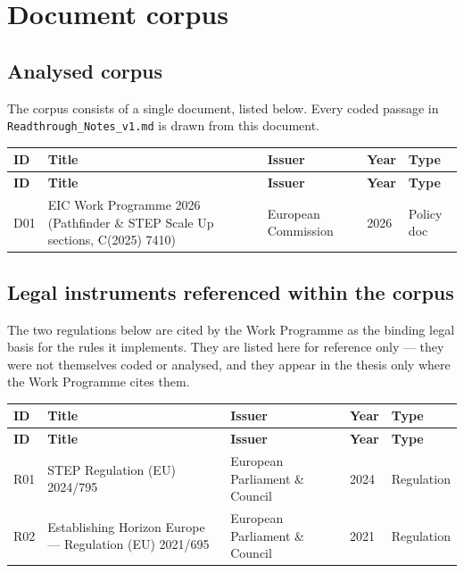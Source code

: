 %

\chapter{Document corpus}
\label{app:doc-corpus}

\section*{Analysed corpus}

The corpus consists of a single document, listed below. Every coded
passage in \texttt{Readthrough\_Notes\_v1.md} is drawn from this
document.

\begin{longtable}{@{} l p{6.5cm} l l l @{}}
\toprule
\textbf{ID} & \textbf{Title} & \textbf{Issuer} & \textbf{Year} & \textbf{Type} \\
\midrule
\endfirsthead
\toprule
\textbf{ID} & \textbf{Title} & \textbf{Issuer} & \textbf{Year} & \textbf{Type} \\
\midrule
\endhead
\bottomrule
\endfoot
D01 & EIC Work Programme 2026 (Pathfinder \& STEP Scale Up sections, C(2025) 7410) & European Commission & 2026 & Policy doc \\
\end{longtable}

\section*{Legal instruments referenced within the corpus}

The two regulations below are cited by the Work Programme as the
binding legal basis for the rules it implements. They are listed here
for reference only --- they were not themselves coded or analysed, and
they appear in the thesis only where the Work Programme cites them.

\begin{longtable}{@{} l p{6.5cm} l l l @{}}
\toprule
\textbf{ID} & \textbf{Title} & \textbf{Issuer} & \textbf{Year} & \textbf{Type} \\
\midrule
\endfirsthead
\toprule
\textbf{ID} & \textbf{Title} & \textbf{Issuer} & \textbf{Year} & \textbf{Type} \\
\midrule
\endhead
\bottomrule
\endfoot
R01 & STEP Regulation (EU) 2024/795 & European Parliament \& Council & 2024 & Regulation \\
R02 & Establishing Horizon Europe --- Regulation (EU) 2021/695 & European Parliament \& Council & 2021 & Regulation \\
\end{longtable}


